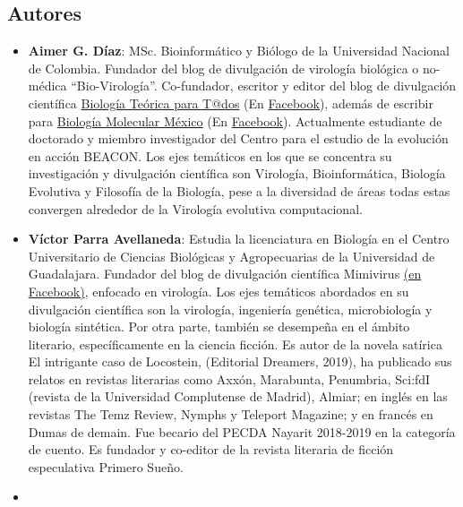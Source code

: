 \documentclass[
  12pt, krantz2,
  spanish,
]{krantz}
\begin{document}
\hypertarget{autores}{%
\subsection*{Autores}\label{autores}}

\begin{itemize}
\item
  \textbf{Aimer G. Díaz}: MSc. Bioinformático y Biólogo de la Universidad Nacional de Colombia. Fundador del blog de divulgación de virología biológica o no-médica ``Bio-Virología''. Co-fundador, escritor y editor del blog de divulgación científica \href{https://bioteorica.wixsite.com/bioteorica/blog}{Biología Teórica para T@dos} (En \href{https://www.facebook.com/BioTeoricaParaTodos/}{Facebook}), además de escribir para \href{http://www.biologiamolecularmexico.com/}{Biología Molecular México} (En \href{https://www.facebook.com/biologiamolecularmexico/}{Facebook}). Actualmente estudiante de doctorado y miembro investigador del Centro para el estudio de la evolución en acción BEACON. Los ejes temáticos en los que se concentra su investigación y divulgación científica son Virología, Bioinformática, Biología Evolutiva y Filosofía de la Biología, pese a la diversidad de áreas todas estas convergen alrededor de la Virología evolutiva computacional.
\item
  \textbf{Víctor Parra Avellaneda}: Estudia la licenciatura en Biología en el Centro Universitario de Ciencias Biológicas y Agropecuarias de la Universidad de Guadalajara. Fundador del blog de divulgación científica Mimivirus \href{https://www.facebook.com/Mimivirus-100736401569015}{(en Facebook)}, enfocado en virología. Los ejes temáticos abordados en su divulgación científica son la virología, ingeniería genética, microbiología y biología sintética. Por otra parte, también se desempeña en el ámbito literario, específicamente en la ciencia ficción. Es autor de la novela satírica El intrigante caso de Locostein, (Editorial Dreamers, 2019), ha publicado sus relatos en revistas literarias como Axxón, Marabunta, Penumbria, Sci:fdI (revista de la Universidad Complutense de Madrid), Almiar; en inglés en las revistas The Temz Review, Nymphs y Teleport Magazine; y en francés en Dumas de demain. Fue becario del PECDA Nayarit 2018-2019 en la categoría de cuento. Es fundador y co-editor de la revista literaria de ficción especulativa Primero Sueño.
\item

\end{itemize}
\end{document}
